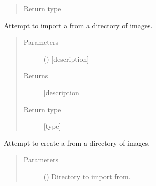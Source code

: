 \documentclass[letterpaper,10pt,english]{sphinxmanual}
\begin{document}
\begin{fulllineitems}
\begin{fulllineitems}
\begin{quote}
\begin{description}
\item[{Return type}] \leavevmode
{\hyperref[\detokenize{polo.threads:polo.threads.thread.QuickThread}]{}}

\end{description}\end{quote}

\end{fulllineitems}


\begin{fulllineitems}
\label{\detokenize{polo.utils:polo.utils.io_utils.RunImporter.import_general_run}}
Attempt to import a  from a directory of images.
\begin{quote}\begin{description}
\item[{Parameters}] \leavevmode
{} (\sphinxstyleliteralemphasis{\sphinxupquote{{[}}}\sphinxstyleliteralemphasis{\sphinxupquote{{]}}}) \textendash{} {[}description{]}

\item[{Returns}] \leavevmode
{[}description{]}

\item[{Return type}] \leavevmode
{[}type{]}

\end{description}\end{quote}

\end{fulllineitems}


\begin{fulllineitems}
\label{\detokenize{polo.utils:polo.utils.io_utils.RunImporter.import_hwi_run}}
Attempt to create a  from a directory of
images.
\begin{quote}\begin{description}
\item[{Parameters}] \leavevmode
{} () \textendash{} Directory to import from.


\end{description}
\end{quote}
\end{fulllineitems}
\end{fulllineitems}
\end{document}
